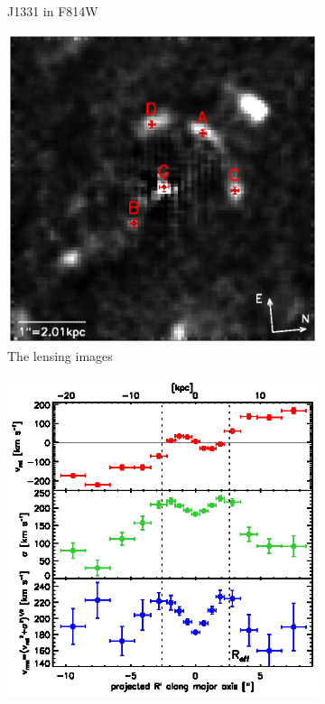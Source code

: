 \begin{figure}
\begin{subfigure}{.5\textwidth}
  \caption{J1331 in F814W}
  \label{fig:F814W}
\end{subfigure}
\begin{subfigure}{.5\textwidth}
  \centering
  \includegraphics[width=.9\linewidth]{fig/lens_imgpos.ps}
  \caption{The lensing images}
  \label{fig:lens_just_imgpos}
\end{subfigure}%
\begin{subfigure}{.5\textwidth}
  \centering
  \includegraphics[width=.9\linewidth]{fig/stellar_kinematics_data.ps}

\end{subfigure}
\end{figure}
